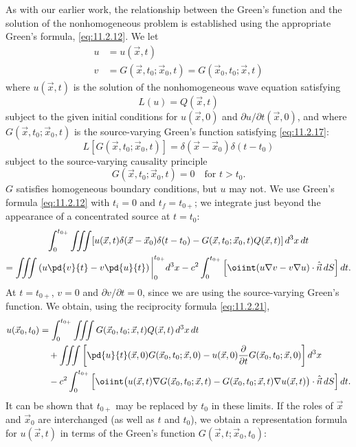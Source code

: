 As with our earlier work, the relationship between the Green's function and the solution of the nonhomogeneous problem is established using the appropriate Green's formula, \eqref{eq:11.2.12}.  We let
\begin{align}
\label{eq:11.2.22}
u &= u(\vec{x},t) \\
\label{eq:11.2.23}
v &= G(\vec{x},t_0;\vec{x}_0,t) = G(\vec{x}_0,t_0;\vec{x},t)
\end{align}
where $u(\vec{x},t)$ is the solution of the nonhomogeneous wave equation satisfying
\[
L(u) = Q(\vec{x},t)
\]
subject to the given initial conditions for $u(\vec{x},0)$ and $\partial u/\partial t(\vec{x},0)$, and where $G(\vec{x},t_0;\vec{x}_0,t)$ is the source-varying Green's function satisfying \eqref{eq:11.2.17}:
\[
L[G(\vec{x},t_0;\vec{x}_0,t)] = \delta(\vec{x} - \vec{x}_0)\delta(t - t_0)
\]
subject to the source-varying causality principle
\[
G(\vec{x},t_0;\vec{x}_0,t) = 0 \quad \text{for } t > t_0.
\]
$G$ satisfies homogeneous boundary conditions, but $u$ may not.  We use Green's formula \eqref{eq:11.2.12} with $t_i = 0$ and $t_f = t_{0+}$; we integrate just beyond the appearance of a concentrated source at $t = t_0$:
\begin{multline*}
\int_0^{t_{0+}} \iiint [u(\vec{x},t)\delta(\vec{x} - \vec{x}_0)\delta(t - t_0) - G(\vec{x},t_0;\vec{x}_0,t)Q(\vec{x},t)]\,d^3x\,dt \\
= \iiint \left(u\pd{v}{t} - v\pd{u}{t}\right)\bigg|_0^{t_{0+}} d^3x - c^2 \int_0^{t_{0+}} \left[\oiint (u\nabla v - v\nabla u)\cdot\hat{\vec{n}}\,dS\right] dt.
\end{multline*}
At $t = t_{0+}$, $v = 0$ and $\partial v/\partial t = 0$, since we are using the source-varying Green's function.  We obtain, using the reciprocity formula \eqref{eq:11.2.21},
\begin{align*}
u(\vec{x}_0,t_0) &= \int_0^{t_{0+}} \iiint G(\vec{x}_0,t_0;\vec{x},t)Q(\vec{x},t)\,d^3x\,dt \\
&\quad + \iiint \left[\pd{u}{t}(\vec{x},0)G(\vec{x}_0,t_0;\vec{x},0) - u(\vec{x},0)\frac{\partial}{\partial t}G(\vec{x}_0,t_0;\vec{x},0)\right] d^3x \\
&\quad - c^2 \int_0^{t_{0+}} \left[\oiint \bigl(u(\vec{x},t)\nabla G(\vec{x}_0,t_0;\vec{x},t) - G(\vec{x}_0,t_0;\vec{x},t)\nabla u(\vec{x},t)\bigr)\cdot\hat{\vec{n}}\,dS\right] dt.
\end{align*}
It can be shown that $t_{0+}$ may be replaced by $t_0$ in these limits.  If the roles of $\vec{x}$ and $\vec{x}_0$ are interchanged (as well as $t$ and $t_0$), we obtain a representation formula for $u(\vec{x},t)$ in terms of the Green's function $G(\vec{x},t;\vec{x}_0,t_0)$:
